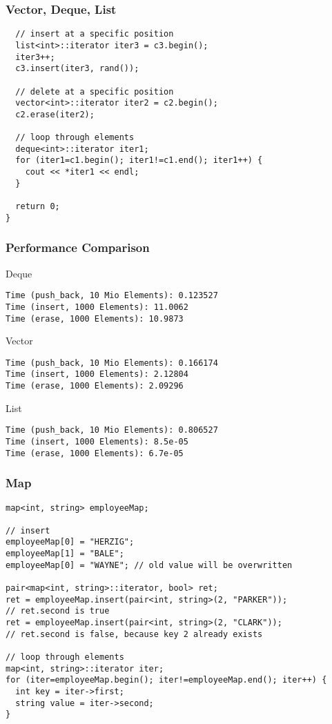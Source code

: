 \begin{frame}[fragile]
\frametitle{Vector, Deque, List}
{\tiny
\begin{lstlisting}
  // insert at a specific position
  list<int>::iterator iter3 = c3.begin();
  iter3++;
  c3.insert(iter3, rand());

  // delete at a specific position
  vector<int>::iterator iter2 = c2.begin();
  c2.erase(iter2);

  // loop through elements
  deque<int>::iterator iter1;
  for (iter1=c1.begin(); iter1!=c1.end(); iter1++) {
    cout << *iter1 << endl;
  }

  return 0;
}
\end{lstlisting}
}
\end{frame}

\begin{frame}[fragile]
  \frametitle{Performance Comparison}
  {\tiny
  Deque
  \begin{verbatim}
Time (push_back, 10 Mio Elements): 0.123527
Time (insert, 1000 Elements): 11.0062
Time (erase, 1000 Elements): 10.9873
  \end{verbatim}
  Vector
  \begin{verbatim}
Time (push_back, 10 Mio Elements): 0.166174
Time (insert, 1000 Elements): 2.12804
Time (erase, 1000 Elements): 2.09296
  \end{verbatim}
  List
  \begin{verbatim}
Time (push_back, 10 Mio Elements): 0.806527
Time (insert, 1000 Elements): 8.5e-05
Time (erase, 1000 Elements): 6.7e-05
  \end{verbatim}
  }
\end{frame}

\begin{frame}[fragile]
\frametitle{Map}
{\tiny
\begin{lstlisting}
map<int, string> employeeMap;

// insert
employeeMap[0] = "HERZIG";
employeeMap[1] = "BALE";
employeeMap[0] = "WAYNE"; // old value will be overwritten

pair<map<int, string>::iterator, bool> ret;
ret = employeeMap.insert(pair<int, string>(2, "PARKER"));
// ret.second is true
ret = employeeMap.insert(pair<int, string>(2, "CLARK"));
// ret.second is false, because key 2 already exists

// loop through elements
map<int, string>::iterator iter;
for (iter=employeeMap.begin(); iter!=employeeMap.end(); iter++) {
  int key = iter->first;
  string value = iter->second;
}
\end{lstlisting}
}
\end{frame}

